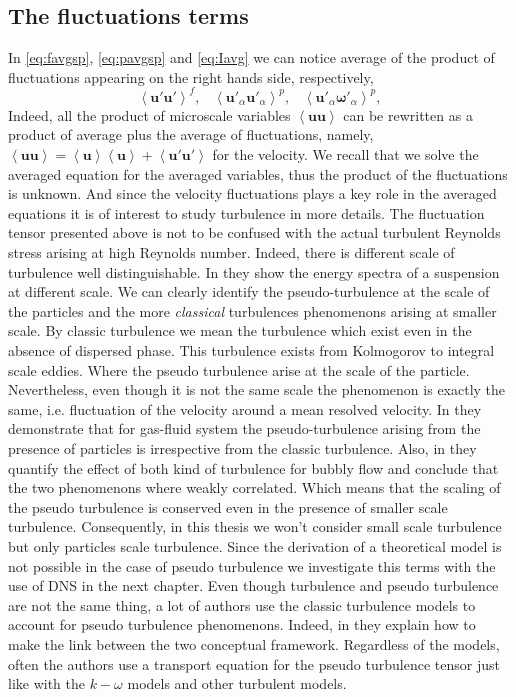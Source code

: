 \subsection{The fluctuations terms}
In \ref{eq:favgsp}, \ref{eq:pavgsp} and \ref{eq:Iavg} we can notice average of the product of fluctuations appearing on the right hands side, respectively,
\begin{equation}
    \left<\bm{u'u'}\right>^f, \;\;\;\left<\bm{u'}_\alpha \bm{u'}_\alpha\right>^p, \;\;\;\left<\bm{u'}_\alpha \bm{\omega}'_\alpha\right>^p,
\end{equation} 
Indeed, all the product of microscale variables $\left<\bm{uu}\right>$ can be rewritten as a product of average plus the average of fluctuations, namely, $\left<\bm{uu}\right> = \left<\bm{u}\right>\left<\bm{u}\right> + \left<\bm{u'u'}\right>$ for the velocity. 
We recall that we solve the averaged equation for the averaged variables, thus the product of the fluctuations is unknown.
And since the velocity fluctuations plays a key role in the averaged equations it is of interest to study turbulence in more details. 
The fluctuation tensor presented above is not to be confused with the actual turbulent Reynolds stress arising at high Reynolds number. 
Indeed, there is different scale of turbulence well distinguishable. 
In \cite[Figure 1]{balachandar2009scaling} they show the energy spectra of a suspension at different scale.
We can clearly identify the pseudo-turbulence at the scale of the particles and the more \textit{classical} turbulences phenomenons arising at smaller scale. 
By classic turbulence we mean the turbulence which exist even in the absence of dispersed phase. 
This turbulence exists from Kolmogorov to integral scale eddies. 
Where the pseudo turbulence arise at the scale of the particle.
Nevertheless, even though it is not the same scale the phenomenon is exactly the same, i.e. fluctuation of the velocity around a mean resolved velocity. 
In \citet{mehrabadi2015pseudo} they demonstrate that for gas-fluid system the pseudo-turbulence arising from the presence of particles is irrespective from the classic turbulence. 
Also, in \citet{risso2018agitation} they quantify the effect of both kind of turbulence for bubbly flow and conclude that the two phenomenons where weakly correlated. 
Which means that the scaling of the pseudo turbulence is conserved even in the presence of smaller scale turbulence. 
Consequently, in this thesis we won't consider small scale turbulence but only particles scale turbulence. 
Since the derivation of a theoretical model is not possible in the case of pseudo turbulence we investigate this terms with the use of DNS in the next chapter.
Even though turbulence and pseudo turbulence are not the same thing, a lot of authors use the classic turbulence models to account for pseudo turbulence phenomenons. 
Indeed, in \citet{gemello2018modelling} they explain how to make the link between the two conceptual framework.
Regardless of the models, often the authors use a transport equation for the pseudo turbulence tensor \citep{du2022analysis} just like with the $k-\omega$ models and other turbulent models. 
